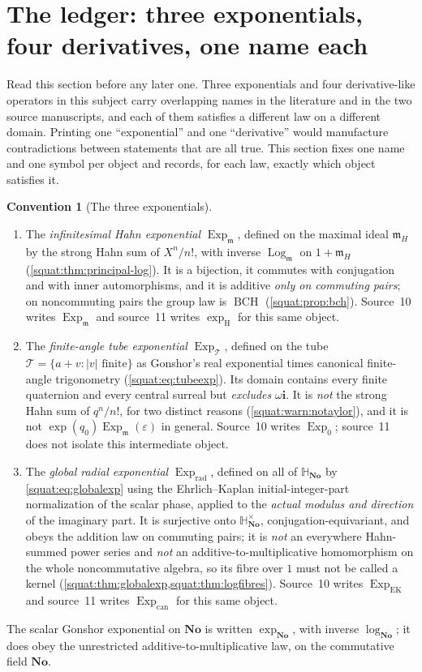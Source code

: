 \documentclass[11pt,letterpaper]{article}
\numberwithin{equation}{section}
\theoremstyle{definition}
\newtheorem{convention}[convention]{Convention}
\theoremstyle{remark}
\newcommand{\No}{\mathbf{No}}
\newcommand{\SQ}{\mathbb H_{\No}}
\newcommand{\mm}{\mathfrak m}
\newcommand{\eps}{\varepsilon}
\newcommand{\ii}{\mathbf i}
\newcommand{\Exp}{\operatorname{Exp}}
\newcommand{\Log}{\operatorname{Log}}
\newcommand{\Expm}{\Exp_{\mm}}
\newcommand{\Logm}{\Log_{\mm}}
\newcommand{\Expt}{\Exp_{\mathcal T}}
\newcommand{\Expr}{\Exp_{\mathrm{rad}}}
\newcommand{\BCH}{\operatorname{BCH}}
\newcommand{\abs}[1]{\left|#1\right|}
\begin{document}
\section{The ledger: three exponentials, four derivatives, one name each}\label{squat:sec:ledger}

Read this section before any later one. Three exponentials and four derivative-like
operators in this subject carry overlapping names in the literature and in the two
source manuscripts, and each of them satisfies a different law on a different domain.
Printing one ``exponential'' and one ``derivative'' would manufacture contradictions
between statements that are all true. This section fixes one name and one symbol per
object and records, for each law, exactly which object satisfies it.

\begin{convention}[The three exponentials]\label{squat:conv:exps}
\begin{enumerate}[label=\textup{(\alph*)},leftmargin=2.4em]
\item The \emph{infinitesimal Hahn exponential} $\Expm$, defined on the maximal ideal
$\mm_H$ by the strong Hahn sum of $X^n/n!$, with inverse $\Logm$ on $1+\mm_H$
(\cref{squat:thm:principal-log}). It is a bijection, it commutes with conjugation and
with inner automorphisms, and it is additive \emph{only on commuting pairs}; on
noncommuting pairs the group law is $\BCH$ (\cref{squat:prop:bch}). Source~10 writes
$\Exp_{\mm}$ and source~11 writes $\exp_{\mathrm H}$ for this same object.
\item The \emph{finite-angle tube exponential} $\Expt$, defined on the tube
$\mathcal T=\{a+v:\abs{v}\text{ finite}\}$ as Gonshor's real exponential times canonical
finite-angle trigonometry (\cref{squat:eq:tubeexp}). Its domain contains every finite
quaternion and every central surreal but \emph{excludes} $\omega\ii$. It is
\emph{not} the strong Hahn sum of $q^n/n!$, for two distinct reasons
(\cref{squat:warn:notaylor}), and it is not $\exp(q_0)\Expm(\eps)$ in general. Source~10
writes $\Exp_0$; source~11 does not isolate this intermediate object.
\item The \emph{global radial exponential} $\Expr$, defined on all of $\SQ$ by
\cref{squat:eq:globalexp} using the Ehrlich--Kaplan initial-integer-part normalization
of the scalar phase, applied to the \emph{actual modulus and direction} of the imaginary
part. It is surjective onto $\SQ^\times$, conjugation-equivariant, and obeys the
addition law on commuting pairs; it is \emph{not} an everywhere Hahn-summed power series and
\emph{not} an additive-to-multiplicative homomorphism on the whole noncommutative
algebra, so its fibre over $1$ must not be called a kernel
(\cref{squat:thm:globalexp,squat:thm:logfibres}). Source~10 writes $\Exp_{\mathrm{EK}}$
and source~11 writes $\Exp_{\mathrm{can}}$ for this same object.
\end{enumerate}
The scalar Gonshor exponential on $\No$ is written $\exp_{\No}$, with inverse
$\log_{\No}$; it does obey the unrestricted additive-to-multiplicative law, on the
commutative field $\No$.
\end{convention}
\end{document}
